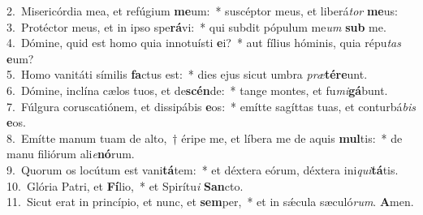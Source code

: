 {2.~}Misericórdia mea, et refúgium \textbf{me}um:~* suscéptor meus, et liberá\textit{tor} \textbf{me}us:\\
{3.~}Protéctor meus, et in ipso spe\textbf{rá}vi:~* qui subdit pópulum me\textit{um} \textbf{sub} me.\\
{4.~}Dómine, quid est homo quia innotuísti \textbf{e}i?~* aut fílius hóminis, quia répu\textit{tas} \textbf{e}um?\\
{5.~}Homo vanitáti símilis \textbf{fa}ctus est:~* dies ejus sicut umbra \textit{præ}\textbf{té}\textbf{re}unt.\\
{6.~}Dómine, inclína cælos tuos, et de\textbf{scén}de:~* tange montes, et fu\textit{mi}\textbf{gá}bunt.\\
{7.~}Fúlgura coruscatiónem, et dissipábis \textbf{e}os:~* emítte sagíttas tuas, et conturbá\textit{bis} \textbf{e}os.\\
{8.~}Emítte manum tuam de alto,~† éripe me, et líbera me de aquis \textbf{mul}tis:~* de manu filiórum ali\textit{e}\textbf{nó}rum.\\
{9.~}Quorum os locútum est vani\textbf{tá}tem:~* et déxtera eórum, déxtera ini\textit{qui}\textbf{tá}tis.\\
{10.~}Glória Patri, et \textbf{Fí}lio,~* et Spirítu\textit{i} \textbf{San}cto.\\
{11.~}Sicut erat in princípio, et nunc, et \textbf{sem}per,~* et in sǽcula sæculó\textit{rum}. \textbf{A}men.\\
